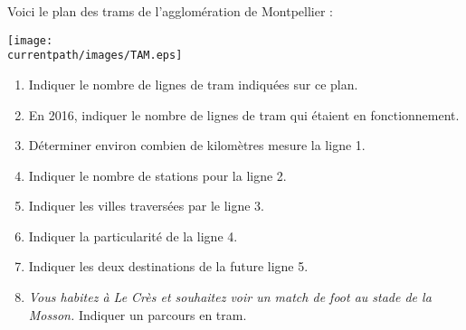 \begin{exercice}
    Voici le plan des trams de l'agglomération de Montpellier : \\ [1mm]
    \begin{minipage}{11.5cm}
       \texttt{[image: \\currentpath/images/TAM.eps]}
    \end{minipage}
    \quad
    \begin{minipage}{5.5cm}
       \begin{enumerate}
          \item Indiquer le nombre de lignes de tram indiquées sur ce plan.
          \item En 2016, indiquer le nombre de lignes de tram qui étaient en fonctionnement.
          \item Déterminer environ combien de kilomètres mesure la ligne 1.
          \item Indiquer le nombre de stations pour la ligne 2.
          \item Indiquer les villes traversées par le ligne 3.
          \item Indiquer la particularité de la ligne 4.
          \item Indiquer les deux destinations de la future ligne 5.          
          \item \textit{Vous habitez à Le Crès et souhaitez voir un match de foot au stade de la Mosson.}
          Indiquer un parcours en tram.
       \end{enumerate}       
    \end{minipage}
 \end{exercice}